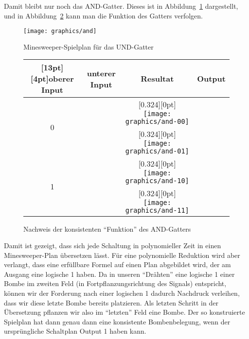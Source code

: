 Damit bleibt nur noch das AND-Gatter. Dieses ist in Abbildung~\ref{andgate}
dargestellt, und in Abbildung~\ref{andstates} kann man die Funktion des
Gatters verfolgen.

\begin{figure}
\begin{center}
\texttt{[image: graphics/and]}
\end{center}
\caption{Minesweeper-Spielplan für das UND-Gatter\label{andgate}}
\end{figure}%
\begin{figure}
\begin{center}
\begin{tabular}{|c|c|c|c|}
\hline
\raisebox{0pt}[13pt][4pt]{oberer Input}&unterer Input&Resultat&Output\\
\hline
\multirow{2}{10pt}{0}&%
\raisebox{11ex}{$0$}&%
\raisebox{0pt}[0.324\hsize][0pt]{%
\texttt{[image: graphics/and-00]}}&%
\raisebox{11ex}{$0$}%
\\
\cline{2-4}
&\raisebox{11ex}{$1$}&%
\raisebox{0pt}[0.324\hsize][0pt]{%
\texttt{[image: graphics/and-01]}}&%
\raisebox{11ex}{$0$}%
\\
\hline
\multirow{2}{10pt}{1}&%
\raisebox{11ex}{$0$}&%
\raisebox{0pt}[0.324\hsize][0pt]{%
\texttt{[image: graphics/and-10]}}&%
\raisebox{11ex}{$0$}%
\\
\cline{2-4}
&\raisebox{11ex}{$1$}&%
\raisebox{0pt}[0.324\hsize][0pt]{%
\texttt{[image: graphics/and-11]}}&%
\raisebox{11ex}{$1$}%
\\
\hline
\end{tabular}
\end{center}
\caption{Nachweis der konsistenten ``Funktion'' des AND-Gatters
\label{andstates}}
\end{figure}%

Damit ist gezeigt, dass sich jede Schaltung in polynomieller Zeit in 
einen Minesweeper-Plan übersetzen lässt. Für eine polynomielle
Reduktion wird aber verlangt, dass eine erfüllbare Formel auf einen
Plan abgebildet wird, der am Ausgang eine logische 1 haben.
Da in unseren ``Drähten'' eine logische 1 einer Bombe im zweiten
Feld (in Fortpflanzungsrichtung des Signals) entspricht, können
wir der Forderung nach einer logischen 1 dadurch Nachdruck verleihen,
dass wir diese letzte Bombe bereits platzieren. Als letzten Schritt
in der Übersetzung pflanzen wir also im ``letzten'' Feld eine Bombe.
Der so konstruierte Spielplan hat dann genau dann eine konsistente
Bombenbelegung, wenn der ursprüngliche Schaltplan Output 1 haben kann.

